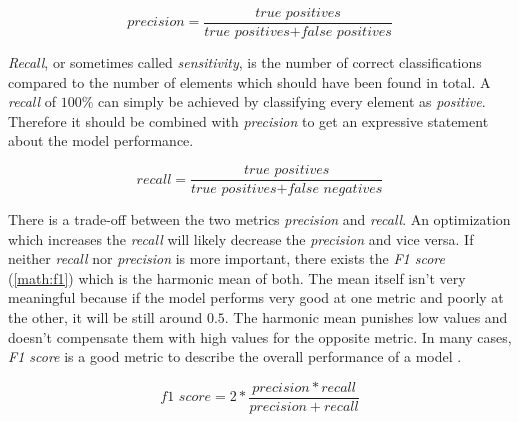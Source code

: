 \begin{equation}
    \label{math:precision}
    precision = \frac{\textit{true positives}}{\textit{true positives} + \textit{false positives}}
\end{equation}

\emph{Recall}, or sometimes called \emph{sensitivity}, is the number of correct classifications compared to the number of elements
which should have been found in total. A \emph{recall} of $100\%$ can simply be achieved by classifying every element as \emph{positive}.
Therefore it should be combined with \emph{precision} to get an expressive statement about the model performance.

\begin{equation}
    \label{math:recall}
    recall = \frac{\textit{true positives}}{\textit{true positives} + \textit{false negatives}}
\end{equation}

There is a trade-off between the two metrics \emph{precision} and \emph{recall}. An optimization which increases the \emph{recall}
will likely decrease the \emph{precision} and vice versa. If neither \emph{recall} nor \emph{precision} is more important, there
exists the \emph{F1 score} (\ref{math:f1}) which is the harmonic mean of both. The mean itself isn't very meaningful because if the
model performs very good at one metric and poorly at the other, it will be still around $0.5$. The harmonic mean punishes low values
and doesn't compensate them with high values for the opposite metric. In many cases, \emph{F1 score} is a good metric to describe the
overall performance of a model \cite{Grus15}.

\begin{equation}
    \label{math:f1}
    \textit{f1 score} = 2 * \frac{precision * recall}{precision + recall}
\end{equation}

